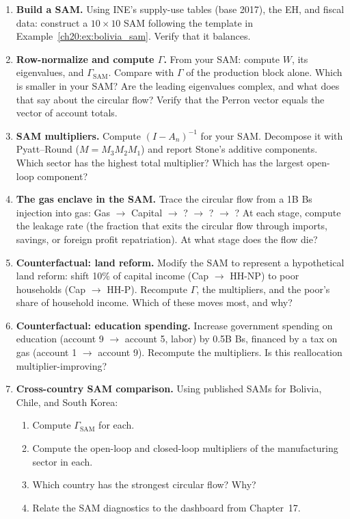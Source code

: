 \documentclass[../structural_economics_book.tex]{subfiles}
\begin{document}
\begin{enumerate}[label=\textbf{20.\arabic*}, leftmargin=3em]

\item \textbf{Build a SAM.} Using INE's supply-use tables (base 2017), the EH, and fiscal data: construct a $10 \times 10$ SAM following the template in Example~\ref{ch20:ex:bolivia_sam}. Verify that it balances.

\item \textbf{Row-normalize and compute $\Gamma$.} From your SAM: compute $W$, its eigenvalues, and $\Gamma_{\text{SAM}}$. Compare with $\Gamma$ of the production block alone. Which is smaller in your SAM? Are the leading eigenvalues complex, and what does that say about the circular flow? Verify that the Perron vector equals the vector of account totals.

\item \textbf{SAM multipliers.} Compute $(I - A_n)^{-1}$ for your SAM. Decompose it with Pyatt--Round ($M = M_3M_2M_1$) and report Stone's additive components. Which sector has the highest total multiplier? Which has the largest open-loop component?

\item \textbf{The gas enclave in the SAM.} Trace the circular flow from a 1B Bs injection into gas: Gas $\to$ Capital $\to$ ? $\to$ ? $\to$ ? At each stage, compute the leakage rate (the fraction that exits the circular flow through imports, savings, or foreign profit repatriation). At what stage does the flow die?

\item \textbf{Counterfactual: land reform.} Modify the SAM to represent a hypothetical land reform: shift 10\% of capital income (Cap $\to$ HH-NP) to poor households (Cap $\to$ HH-P). Recompute $\Gamma$, the multipliers, and the poor's share of household income. Which of these moves most, and why?

\item \textbf{Counterfactual: education spending.} Increase government spending on education (account 9 $\to$ account 5, labor) by 0.5B Bs, financed by a tax on gas (account 1 $\to$ account 9). Recompute the multipliers. Is this reallocation multiplier-improving?

\item \textbf{Cross-country SAM comparison.} Using published SAMs for Bolivia, Chile, and South Korea:
\begin{enumerate}
\item Compute $\Gamma_{\text{SAM}}$ for each.
\item Compute the open-loop and closed-loop multipliers of the manufacturing sector in each.
\item Which country has the strongest circular flow? Why?
\item Relate the SAM diagnostics to the dashboard from Chapter~17.
\end{enumerate}
\end{enumerate}
\end{document}
